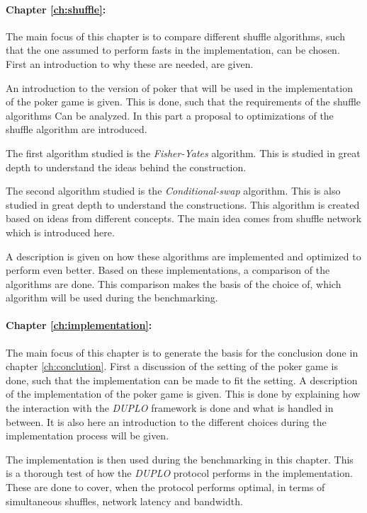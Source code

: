\documentclass[twoside,11pt,openright]{report}
\newcommand{\FY}{\textit{Fisher-Yates} }
\newcommand{\CS}{\textit{Conditional-swap} }
\newcommand{\DUPLO}{\textit{DUPLO} }
\begin{document}
\paragraph{Chapter \ref{ch:shuffle}:}
The main focus of this chapter is to compare different shuffle algorithms, such that the one assumed to perform fasts in the implementation, can be chosen. First an introduction to why these are needed, are given.

An introduction to the version of poker that will be used in the implementation of the poker game is given. This is done, such that the requirements of the shuffle algorithms Can be analyzed. In this part a proposal to optimizations of the shuffle algorithm are introduced. 

The first algorithm studied is the \FY algorithm. This is studied in great depth to understand the ideas behind the construction.

The second algorithm studied is the \CS algorithm. This is also studied in great depth to understand the constructions. This algorithm is created based on ideas from different concepts. The main idea comes from shuffle network which is introduced here. 

A description is given on how these algorithms are implemented and optimized to perform even better. Based on these implementations, a comparison of the algorithms are done. This comparison makes the basis of the choice of, which algorithm will be used during the benchmarking.


\paragraph{Chapter \ref{ch:implementation}:}
The main focus of this chapter is to generate the basis for the conclusion done in chapter \ref{ch:conclution}. First a discussion of the setting of the poker game is done, such that the implementation can be made to fit the setting. A description of the implementation of the poker game is given. This is done by explaining how the interaction with the \DUPLO framework is done and what is handled in between. It is also here an introduction to the different choices during the implementation process will be given.

The implementation is then used during the benchmarking in this chapter. This is a thorough test of how the \DUPLO protocol performs in the implementation. These are done to cover, when the protocol performs optimal, in terms of simultaneous shuffles, network latency and bandwidth.
\end{document}
